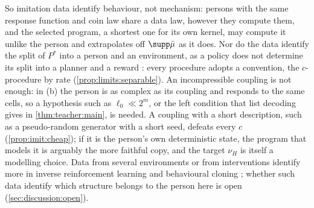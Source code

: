 So imitation data identify behaviour, not mechanism: persons with the same response function and coin law share a data law, however they compute them, and the selected program, a shortest one for its own kernel, may compute it unlike the person and extrapolates off $\supp\bar\mu$ as it does. Nor do the data identify the split of $P^*$ into a person and an environment, as a policy does not determine its split into a planner and a reward \citep{armstrong2018occam}: every procedure adopts a convention, the $c$-procedure by rate (\cref{prop:limits:separable}). An incompressible coupling is not enough: in (b) the person is as complex as its coupling and responds to the same cells, so a hypothesis such as $\ell_0\ll2^m$, or the left condition that list decoding gives in \cref{thm:teacher:main}, is needed. A coupling with a short description, such as a pseudo-random generator with a short seed, defeats every $c$ (\cref{prop:imit:cheap}); if it is the person's own deterministic state, the program that models it is arguably the more faithful copy, and the target $\nu_H$ is itself a modelling choice. Data from several environments or from interventions identify more in inverse reinforcement learning and behavioural cloning \citep{cao2021identifiability,dehaan2019causal}; whether such data identify which structure belongs to the person here is open (\cref{sec:discussion:open}).
